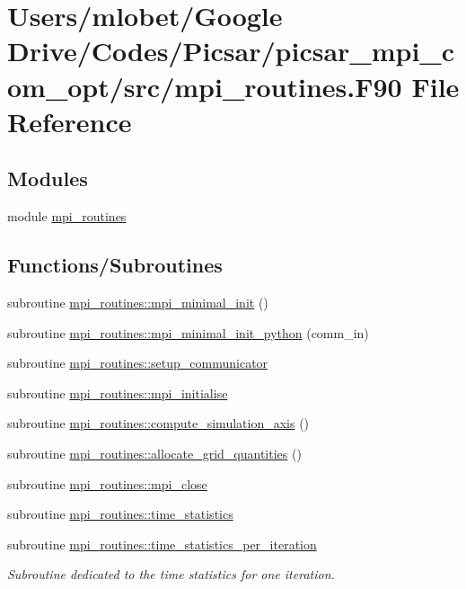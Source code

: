 \hypertarget{mpi__routines_8_f90}{}\section{Users/mlobet/\+Google Drive/\+Codes/\+Picsar/picsar\+\_\+mpi\+\_\+com\+\_\+opt/src/mpi\+\_\+routines.F90 File Reference}
\label{mpi__routines_8_f90}
\subsection*{Modules}
\begin{DoxyCompactItemize}
\item 
module \hyperlink{namespacempi__routines}{mpi\+\_\+routines}
\end{DoxyCompactItemize}
\subsection*{Functions/\+Subroutines}
\begin{DoxyCompactItemize}
\item 
subroutine \hyperlink{namespacempi__routines_a61438ec53719149e70d0600171070933}{mpi\+\_\+routines\+::mpi\+\_\+minimal\+\_\+init} ()
\item 
subroutine \hyperlink{namespacempi__routines_a207f6d765479d24553ae1186200a5d9d}{mpi\+\_\+routines\+::mpi\+\_\+minimal\+\_\+init\+\_\+python} (comm\+\_\+in)
\item 
subroutine \hyperlink{namespacempi__routines_a32b858516b2e2b02580cf4ce8cb40ccc}{mpi\+\_\+routines\+::setup\+\_\+communicator}
\item 
subroutine \hyperlink{namespacempi__routines_a2574986e9474b6d4144f099df814e257}{mpi\+\_\+routines\+::mpi\+\_\+initialise}
\item 
subroutine \hyperlink{namespacempi__routines_ac6bf7d666673e87855069981a4a664d5}{mpi\+\_\+routines\+::compute\+\_\+simulation\+\_\+axis} ()
\item 
subroutine \hyperlink{namespacempi__routines_a483f086b039961c1b48127fc9d81cf65}{mpi\+\_\+routines\+::allocate\+\_\+grid\+\_\+quantities} ()
\item 
subroutine \hyperlink{namespacempi__routines_ab1a2d976a5017905d06e301f5af07ad2}{mpi\+\_\+routines\+::mpi\+\_\+close}
\item 
subroutine \hyperlink{namespacempi__routines_a39928834ab9f9c980ffc2e7849cf8af3}{mpi\+\_\+routines\+::time\+\_\+statistics}
\item 
subroutine \hyperlink{namespacempi__routines_aae81751f0f074a5eba4ddc0126bfd5cd}{mpi\+\_\+routines\+::time\+\_\+statistics\+\_\+per\+\_\+iteration}
\begin{DoxyCompactList}\small\item\em Subroutine dedicated to the time statistics for one iteration. \end{DoxyCompactList}\end{DoxyCompactItemize}
